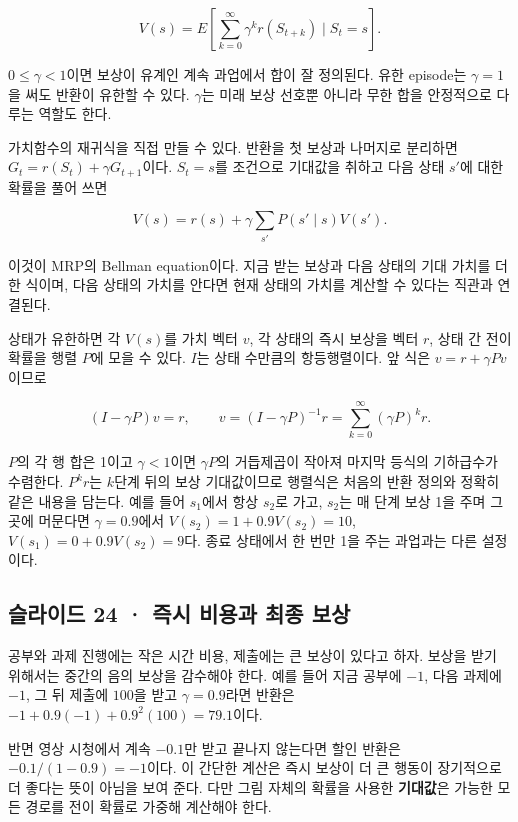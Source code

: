 \documentclass[11pt,a4paper]{article}
\begin{document}
\[
V(s)=E\!\left[\sum_{k=0}^{\infty}\gamma^k r(S_{t+k})\mid S_t=s\right].
\]

$0\le\gamma<1$이면 보상이 유계인 계속 과업에서 합이 잘 정의된다. 유한 episode는 $\gamma=1$을 써도 반환이 유한할 수 있다. $\gamma$는 미래 보상 선호뿐 아니라 무한 합을 안정적으로 다루는 역할도 한다.\par

가치함수의 재귀식을 직접 만들 수 있다. 반환을 첫 보상과 나머지로 분리하면 $G_t=r(S_t)+\gamma G_{t+1}$이다. $S_t=s$를 조건으로 기대값을 취하고 다음 상태 $s'$에 대한 확률을 풀어 쓰면\par

\[
V(s)=r(s)+\gamma\sum_{s'}P(s'\mid s)V(s').
\]

이것이 MRP의 Bellman equation이다. 지금 받는 보상과 다음 상태의 기대 가치를 더한 식이며, 다음 상태의 가치를 안다면 현재 상태의 가치를 계산할 수 있다는 직관과 연결된다.\par

상태가 유한하면 각 $V(s)$를 가치 벡터 $v$, 각 상태의 즉시 보상을 벡터 $r$, 상태 간 전이확률을 행렬 $P$에 모을 수 있다. $I$는 상태 수만큼의 항등행렬이다. 앞 식은 $v=r+\gamma Pv$이므로\par

\[
(I-\gamma P)v=r,
\qquad v=(I-\gamma P)^{-1}r
=\sum_{k=0}^{\infty}(\gamma P)^k r.
\]

$P$의 각 행 합은 1이고 $\gamma<1$이면 $\gamma P$의 거듭제곱이 작아져 마지막 등식의 기하급수가 수렴한다. $P^k r$는 $k$단계 뒤의 보상 기대값이므로 행렬식은 처음의 반환 정의와 정확히 같은 내용을 담는다. 예를 들어 $s_1$에서 항상 $s_2$로 가고, $s_2$는 매 단계 보상 1을 주며 그곳에 머문다면 $\gamma=0.9$에서 $V(s_2)=1+0.9V(s_2)=10$, $V(s_1)=0+0.9V(s_2)=9$다. 종료 상태에서 한 번만 1을 주는 과업과는 다른 설정이다.\par

\subsection{슬라이드 24 · 즉시 비용과 최종 보상}

공부와 과제 진행에는 작은 시간 비용, 제출에는 큰 보상이 있다고 하자. 보상을 받기 위해서는 중간의 음의 보상을 감수해야 한다. 예를 들어 지금 공부에 $-1$, 다음 과제에 $-1$, 그 뒤 제출에 $100$을 받고 $\gamma=0.9$라면 반환은 $-1+0.9(-1)+0.9^2(100)=79.1$이다.\par

반면 영상 시청에서 계속 $-0.1$만 받고 끝나지 않는다면 할인 반환은 $-0.1/(1-0.9)=-1$이다. 이 간단한 계산은 즉시 보상이 더 큰 행동이 장기적으로 더 좋다는 뜻이 아님을 보여 준다. 다만 그림 자체의 확률을 사용한 \textbf{기대값}은 가능한 모든 경로를 전이 확률로 가중해 계산해야 한다.\par
\end{document}
